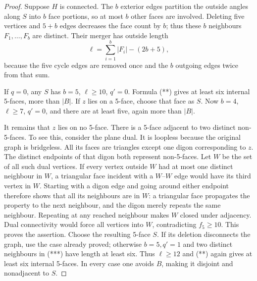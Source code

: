 \documentclass[11pt]{article}
\theoremstyle{remark}
\numberwithin{equation}{section}
\numberwithin{table}{section}
\begin{document}
\begin{proof}
Suppose $H$ is connected. The $b$ exterior edges partition the
outside angles along $S$ into $b$ face portions, so at most $b$
other faces are involved. Deleting five vertices and $5+b$ edges
decreases the face count by $b$; thus these $b$ neighbours
$F_1,\ldots,F_b$ are distinct. Their merger has outside length
\[
 \ell=\sum_{i=1}^b|F_i|-(2b+5),                       \tag{***}
\]
because the five cycle edges are removed once and the $b$ outgoing
edges twice from that sum.

If $q=0$, any $S$ has $b=5$, $\ell\ge10$, $q'=0$.
Formula (**) gives at least six internal 5-faces, more than $|B|$.
If $z$ lies on a 5-face, choose that face as $S$. Now $b=4$,
$\ell\ge7$, $q'=0$, and there are at least five, again more than $|B|$.

It remains that $z$ lies on no 5-face. There is a 5-face adjacent
to two distinct non-5-faces. To see this, consider the plane dual.
It is loopless because the original graph is bridgeless.
All its faces are triangles except one digon corresponding to $z$.
The distinct endpoints of that digon both represent non-5-faces.
Let $W$ be the set of all such dual vertices. If every vertex outside
$W$ had at most one distinct neighbour in $W$, a triangular face
incident with a $W$--$W$ edge would have its third vertex in $W$.
Starting with a digon edge and going around either endpoint therefore
shows that all its neighbours are in $W$: a triangular face propagates
the property to the next neighbour, and the digon merely repeats the
same neighbour. Repeating at any reached neighbour makes $W$ closed
under adjacency. Dual connectivity would force all vertices into $W$,
contradicting $f_5\ge10$. This proves the assertion.
Choose the resulting 5-face $S$. If its deletion disconnects the graph,
use the case already proved; otherwise $b=5,q'=1$ and two distinct
neighbours in (***) have length at least six. Thus $\ell\ge12$ and
(**) again gives at least six internal 5-faces. In every case one
avoids $B$, making it disjoint and nonadjacent to $S$.
\end{proof}
\end{document}
